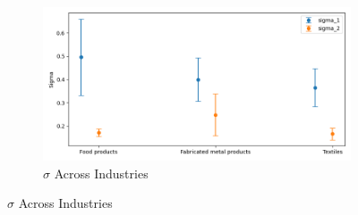 \documentclass{article}
\begin{document}
\begin{figure}[ht!]
\begin{subfigure}[t]{0.32\textwidth}
    \end{subfigure}
    \begin{subfigure}[t]{0.32\textwidth}
        \centering
        \includegraphics[width=\textwidth]{figure/stationary_mixture_sigma_across_industries.png}
        \caption{$\hat\sigma$ Across Industries}
    \end{subfigure}
\end{figure}
\end{document}
